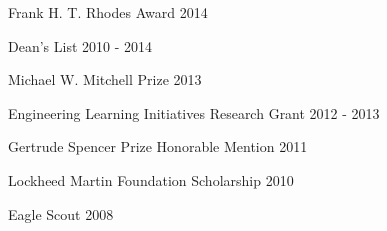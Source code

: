 
Frank H. T. Rhodes Award                        \hfill 2014

Dean's List                                     \hfill 2010 - 2014

Michael W. Mitchell Prize                       \hfill 2013

Engineering Learning Initiatives Research Grant \hfill 2012 - 2013

Gertrude Spencer Prize Honorable Mention        \hfill 2011

Lockheed Martin Foundation Scholarship          \hfill 2010

Eagle Scout                                     \hfill 2008

